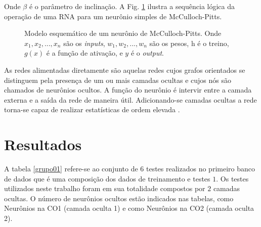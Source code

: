 \documentclass[journal, a4paper]{IEEEtran}
\begin{document}
Onde $\beta$ é o parâmetro de inclinação. A Fig. \ref{Esquematico de McCulloch} ilustra a sequência lógica da operação de uma RNA para um neurônio simples de McCulloch-Pitts. 
\\
\begin{figure}[H]
	\centering
	\setlength{\fboxsep}{8pt}
	\setlength{\fboxrule}{0.1pt}
	\caption{Modelo esquemático de um neurônio de McCulloch-Pitts. Onde $x_{1}, x_{2}, ..., x_{n}$ são os \textit{inputs}, $w_{1}, w_{2}, ..., w_{n}$ são os pesos, h é o treino, $g(x)$ é a função de ativação, e $y$ é o \textit{output}.}
	\label{Esquematico de McCulloch}
\end{figure}

As redes alimentadas diretamente são aquelas redes cujos grafos orientados se distinguem pela presença de um ou mais camadas ocultas e cujos nós são chamados de neurônios ocultos. A função do neurônio é intervir entre a camada externa e a saída da rede de maneira útil. Adicionando-se camadas ocultas a rede torna-se capaz de realizar estatísticas de ordem elevada \citep{Haykin1999}.


\section{Resultados}

A tabela \ref{grupo01} refere-se ao conjunto de $6$ testes realizados no primeiro banco de dados que é uma composição dos dados de treinamento e testes $1$. Os testes utilizados neste trabalho foram em sua totalidade compostos por $2$ camadas ocultas. O número de neurônios ocultos estão indicados nas tabelas, como Neurônios na CO1 (camada oculta 1) e como Neurônios na CO2 (camada oculta 2).
\end{document}
